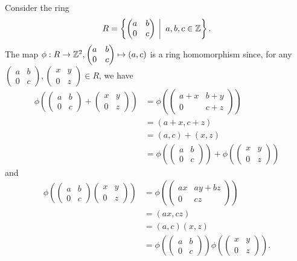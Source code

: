 \begin{example}
    Consider the ring
    \[
        R = \left\{\begin{pmatrix}a&b\\0&c\end{pmatrix}\vert a,b,c\in\Z\right\}.
    \]
    The map $\phi: R \to \mathbb{Z}^2, \begin{pmatrix}a&b\\0&c\end{pmatrix} \mapsto (a,c)$ is a ring homomorphism since, for any $\begin{pmatrix}a&b\\0&c\end{pmatrix}, \begin{pmatrix}x&y\\0&z\end{pmatrix} \in R$, we have
    \begin{align*}
        \phi\left(\begin{pmatrix}a&b\\0&c\end{pmatrix} + \begin{pmatrix}x&y\\0&z\end{pmatrix}\right) &= \phi\left(\begin{pmatrix}a+x&b+y\\0&c+z\end{pmatrix}\right)\\
        &= (a+x,c+z)\\
        &= (a,c) + (x,z)\\
        &= \phi\left(\begin{pmatrix}a&b\\0&c\end{pmatrix}\right) + \phi\left(\begin{pmatrix}x&y\\0&z\end{pmatrix}\right)
    \end{align*}
    and
    \begin{align*}
        \phi\left(\begin{pmatrix}a&b\\0&c\end{pmatrix}\begin{pmatrix}x&y\\0&z\end{pmatrix}\right) &= \phi\left(\begin{pmatrix}ax&ay+bz\\0&cz\end{pmatrix}\right)\\
        &= (ax, cz)\\
        &= (a,c)(x,z)\\
        &= \phi\left(\begin{pmatrix}a&b\\0&c\end{pmatrix}\right)\phi\left(\begin{pmatrix}x&y\\0&z\end{pmatrix}\right).
    \end{align*}
\end{example}
